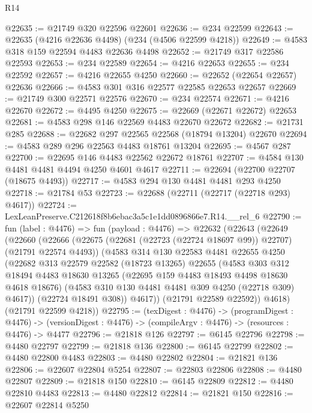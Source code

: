 \begin{lexlean}{R14}
\begin{coremodule}
@22635 := @21749 @320 @22596 @22601
@22636 := @234 @22599
@22643 := @22635 (@4216 @22636 @4498) (@234 (@4506 @22599 @4218))
@22649 := @4583 @318 @159 @22594 @4483 @22636 @4498
@22652 := @21749 @317 @22586 @22593
@22653 := @234 @22589
@22654 := @4216 @22653
@22655 := @234 @22592
@22657 := @4216 @22655 @4250
@22660 := @22652 (@22654 @22657) @22636
@22666 := @4583 @301 @316 @22577 @22585 @22653 @22657
@22669 := @21749 @300 @22571 @22576
@22670 := @234 @22574
@22671 := @4216 @22670
@22672 := @4495 @4250
@22675 := @22669 (@22671 @22672) @22653
@22681 := @4583 @298 @146 @22569 @4483 @22670 @22672
@22682 := @21731 @285
@22688 := @22682 @297 @22565 @22568 (@18794 @13204) @22670
@22694 := @4583 @289 @296 @22563 @4483 @18761 @13204
@22695 := @4567 @287
@22700 := @22695 @146 @4483 @22562 @22672 @18761
@22707 := @4584 @130 @4481 @4481 @4494 @4250 @4601 @4617
@22711 := @22694 (@22700 @22707 (@18675 @4493))
@22717 := @4583 @294 @130 @4481 @4481 @293 @4250
@22718 := @21784 @53
@22723 := @22688 (@22711 (@22717 (@22718 @293) @4617))
@22724 := LexLeanPreserve.C212618f8b6ebac3a5c1e1dd0896866e7.R14.__rel_6
@22790 := fun (label : @4476) =>
  fun (payload : @4476) =>
  @22632
    (@22643
      (@22649
        (@22660
          (@22666
            (@22675 (@22681 (@22723 (@22724 @18697 @99)) @22707) (@21791 @22574 @4493))
            (@4583
              @314
              @130
              @22583
              @4481
              @22655
              @4250
              (@22682
                @313
                @22579
                @22582
                (@18723 @13265)
                @22655
                (@4583
                  @303
                  @312
                  @18494
                  @4483
                  @18630
                  @13265
                  (@22695 @159 @4483 @18493 @4498 @18630 @4618 @18676)
                  (@4583 @310 @130 @4481 @4481 @309 @4250 (@22718 @309) @4617))
                (@22724 @18491 @308))
              @4617))
          (@21791 @22589 @22592))
        @4618)
      (@21791 @22599 @4218))
@22795 := (texDigest : @4476) ->
  (programDigest : @4476) ->
  (versionDigest : @4476) -> (compileArgv : @4476) -> (resources : @4476) -> @4477
@22796 := @21818 @126
@22797 := @6145 @22796
@22798 := @4480 @22797
@22799 := @21818 @136
@22800 := @6145 @22799
@22802 := @4480 @22800 @4483
@22803 := @4480 @22802
@22804 := @21821 @136
@22806 := @22607 @22804 @5254
@22807 := @22803 @22806
@22808 := @4480 @22807
@22809 := @21818 @150
@22810 := @6145 @22809
@22812 := @4480 @22810 @4483
@22813 := @4480 @22812
@22814 := @21821 @150
@22816 := @22607 @22814 @5250

\end{coremodule}
\end{lexlean}
